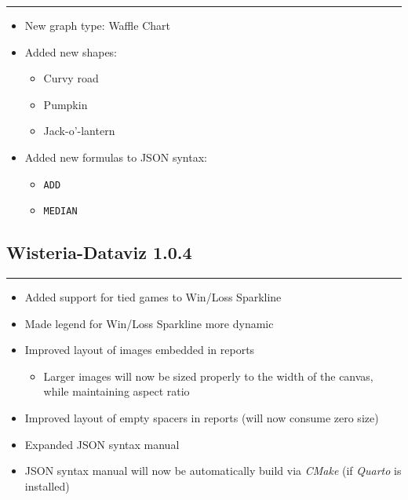 \documentclass[
]{scrartcl}
\providecommand{\tightlist}{%
  \setlength{\itemsep}{0pt}\setlength{\parskip}{0pt}}
\begin{document}
\begin{center}\rule{0.5\linewidth}{0.5pt}\end{center}

\begin{itemize}
\tightlist
\item
  New graph type: Waffle Chart
\item
  Added new shapes:

  \begin{itemize}
  \tightlist
  \item
    Curvy road
  \item
    Pumpkin
  \item
    Jack-o'-lantern
  \end{itemize}
\item
  Added new formulas to JSON syntax:

  \begin{itemize}
  \tightlist
  \item
    \texttt{ADD}
  \item
    \texttt{MEDIAN}
  \end{itemize}
\end{itemize}

\subsection*{Wisteria-Dataviz 1.0.4}\label{section-8}

\begin{center}\rule{0.5\linewidth}{0.5pt}\end{center}

\begin{itemize}
\tightlist
\item
  Added support for tied games to Win/Loss Sparkline
\item
  Made legend for Win/Loss Sparkline more dynamic
\item
  Improved layout of images embedded in reports

  \begin{itemize}
  \tightlist
  \item
    Larger images will now be sized properly to the width of the canvas,
    while maintaining aspect ratio
  \end{itemize}
\item
  Improved layout of empty spacers in reports (will now consume zero
  size)
\item
  Expanded JSON syntax manual
\item
  JSON syntax manual will now be automatically build via \emph{CMake}
  (if \emph{Quarto} is installed)
\end{itemize}
\end{document}
